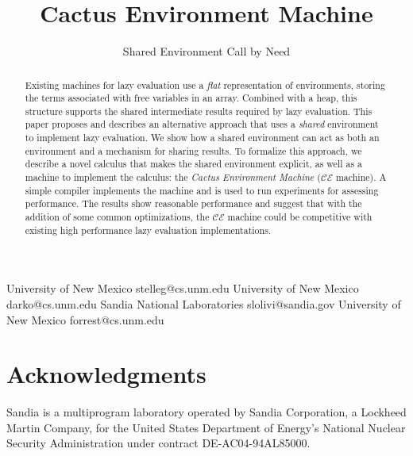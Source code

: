 \documentclass[preprint]{sigplanconf}
\begin{document}
\copyrightdata{[to be supplied]} 


\title{Cactus Environment Machine}
\subtitle{Shared Environment Call by Need}

           {University of New Mexico}
           {stelleg@cs.unm.edu}
           {University of New Mexico}
           {darko@cs.unm.edu}
           {Sandia National Laboratories}
           {slolivi@sandia.gov}
           {University of New Mexico}
           {forrest@cs.unm.edu}

\maketitle

\begin{abstract}
Existing machines for lazy evaluation use a \emph{flat} representation of
environments, storing the terms associated with free variables in an array.
Combined with a heap, this structure supports the shared intermediate
results required by lazy evaluation.  This paper proposes and describes an
alternative approach that uses a \emph{shared} environment to implement lazy
evaluation.  We show how a shared environment can act as both an environment and
a mechanism for sharing results. To formalize this approach, we describe a novel
calculus that makes the shared environment explicit, as well as a machine to
implement the calculus: the \emph{Cactus Environment Machine} ($\mathcal{CE}$
machine). A simple compiler implements the machine and is used to run
experiments for assessing performance.  The results show reasonable performance
and suggest that with the addition of some common optimizations, the
$\mathcal{CE}$ machine could be competitive with existing high performance lazy
evaluation implementations.
\end{abstract}












\section{Acknowledgments}
Sandia is a multiprogram laboratory operated by Sandia Corporation, a Lockheed Martin Company, for the United States Department of Energy’s National Nuclear Security Administration under contract DE-AC04-94AL85000.





\end{document}
